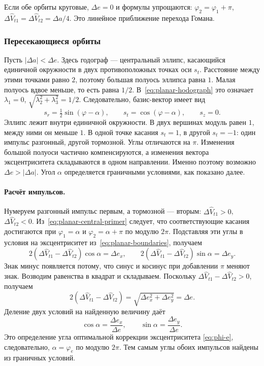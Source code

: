 Если обе орбиты круговые, $\Delta e=0$ и формулы упрощаются:
$\varphi_2=\varphi_1+\pi$,
$\Delta\widehat V_{t1}=\Delta\widehat V_{t2}=\Delta a/4$.
Это линейное приближение перехода Гомана.


\subsubsection{Пересекающиеся орбиты}
\label{sec:planar-crossing}

Пусть $|\Delta a|<\Delta e$. Здесь годограф --- центральный эллипс, касающийся единичной окружности в двух
противоположных точках оси $s_t$.
Расстояние между этими точками равно $2$, поэтому большая полуось
эллипса равна $1$. Малая полуось вдвое меньше, то есть равна $1/2$.
В~\eqref{eq:planar-hodograph} это означает
$\lambda_1=0$, $\sqrt{\lambda_2^2+\lambda_3^2}=1/2$.
Следовательно, базис-вектор имеет вид
\begin{equation}
 s_r=\tfrac12\sin(\varphi-\alpha),\qquad
 s_t=\cos(\varphi-\alpha),\qquad s_z=0.
 \label{eq:planar-central-primer}
\end{equation}
Эллипс лежит внутри единичной окружности. В двух вершинах модуль
равен $1$, между ними он меньше $1$. В одной точке касания $s_t=1$,
в другой $s_t=-1$: один импульс разгонный, другой тормозной.
Углы отличаются на $\pi$. Изменения большой полуоси частично
компенсируются, а изменения вектора эксцентриситета складываются
в одном направлении. Именно поэтому возможно $\Delta e>|\Delta a|$.
Угол $\alpha$ определяется граничными условиями, как показано далее.



\paragraph{Расчёт импульсов.}
Нумеруем разгонный импульс первым, а тормозной --- вторым:
$\Delta\widehat V_{t1}>0$, $\Delta\widehat V_{t2}<0$.
Из~\eqref{eq:planar-central-primer} следует, что соответствующие
касания достигаются при $\varphi_1=\alpha$ и
$\varphi_2=\alpha+\pi$ по модулю $2\pi$.
Подставляя эти углы в условия на эксцентриситет
из~\eqref{eq:planar-boundaries}, получаем
\[
 2(\Delta\widehat V_{t1}-\Delta\widehat V_{t2})\cos\alpha=\Delta e_x,
 \qquad
 2(\Delta\widehat V_{t1}-\Delta\widehat V_{t2})\sin\alpha=\Delta e_y.
\]
Знак минус появляется потому, что синус и косинус при добавлении
$\pi$ меняют знак. Возводим равенства в квадрат и складываем.
Поскольку $\Delta\widehat V_{t1}-\Delta\widehat V_{t2}>0$, получаем
\[
 2(\Delta\widehat V_{t1}-\Delta\widehat V_{t2})
 =\sqrt{\Delta e_x^2+\Delta e_y^2}=\Delta e.
\]
Деление двух условий на найденную величину даёт
\[
 \cos\alpha=\frac{\Delta e_x}{\Delta e},\qquad
 \sin\alpha=\frac{\Delta e_y}{\Delta e}.
\]
Это определение угла оптимальной коррекции эксцентриситета
\eqref{eq:phi-e}, следовательно, $\alpha=\varphi_e$ по модулю $2\pi$.
Тем самым углы обоих импульсов найдены из граничных условий.

